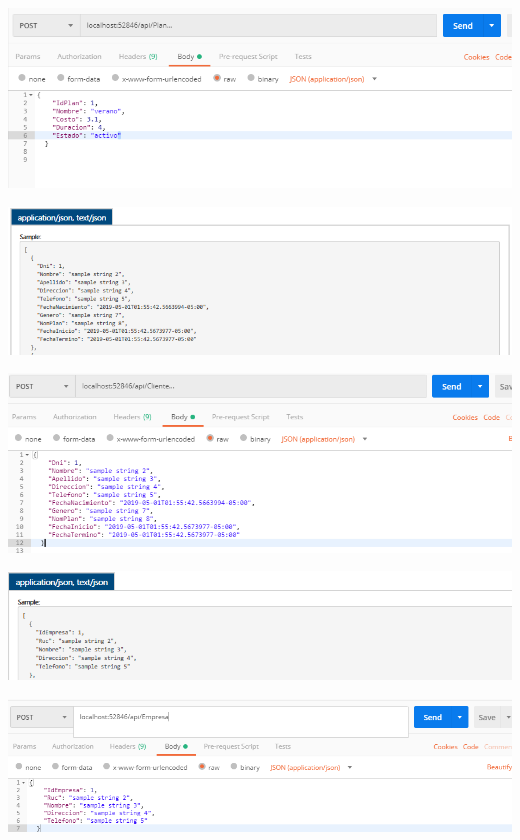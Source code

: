 \begin{center}
			\includegraphics[width=15cm]{./Imagenes/9}
             \end{center}
        \begin{center}
			\includegraphics[width=15cm]{./Imagenes/10}
             \end{center}
\begin{center}
			\includegraphics[width=15cm]{./Imagenes/11}
             \end{center}
\begin{center}
			\includegraphics[width=15cm]{./Imagenes/12}
             \end{center}
\begin{center}
			\includegraphics[width=15cm]{./Imagenes/13}
             \end{center}

